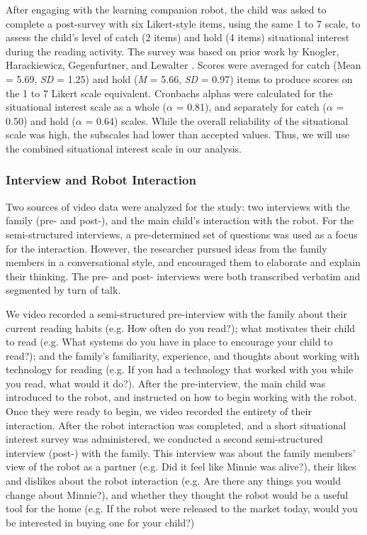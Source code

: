 \documentclass{sigchi}
\begin{document}
  After engaging with the learning companion robot, the child was asked to complete a post-survey with six Likert-style items, using the same 1 to 7 scale, to assess the child's level of catch (2 items) and hold (4 items) situational interest during the reading activity. The survey was based on prior work by Knogler, Harackiewicz, Gegenfurtner, and Lewalter \cite{Knogler:2015}. Scores were averaged for catch (Mean = 5.69, \textit{SD} = 1.25) and hold (\textit{M} = 5.66, \textit{SD} = 0.97) items to produce scores on the 1 to 7 Likert scale equivalent. Cronbachs alphas were calculated for the situational interest scale as a whole ($\alpha$ = 0.81), and separately for catch ($\alpha$ = 0.50) and hold ($\alpha$ = 0.64) scales. While the overall reliability of the situational scale was high, the subscales had lower than accepted values. Thus, we will use the combined situational interest scale in our analysis.
  
\subsubsection{Interview and Robot Interaction}
  Two sources of video data were analyzed for the study: two interviews with the family (pre- and post-), and the main child's interaction with the robot. For the semi-structured interviews, a pre-determined set of questions was used as a focus for the interaction. However, the researcher pursued ideas from the family members in a conversational style, and encouraged them to elaborate and explain their thinking. The pre- and post- interviews were both transcribed verbatim and segmented by turn of talk\cite{Chi:1997}.
 
  We video recorded a semi-structured pre-interview with the family about their current reading habits (e.g. How often do you read?); what motivates their child to read (e.g. What systems do you have in place to encourage your child to read?); and the family's familiarity, experience, and thoughts about working with technology for reading (e.g. If you had a technology that worked with you while you read, what would it do?). After the pre-interview, the main child was introduced to the robot, and instructed on how to begin working with the robot. Once they were ready to begin, we video recorded the entirety of their interaction. After the robot interaction was completed, and a short situational interest survey was administered, we conducted a second semi-structured interview (post-) with the family. This interview was about the family members' view of the robot as a partner (e.g. Did it feel like Minnie was alive?), their likes and dislikes about the robot interaction (e.g. Are there any things you would change about Minnie?), and whether they thought the robot would be a useful tool for the home (e.g. If the robot were released to the market today, would you be interested in buying one for your child?)
  
\end{document}
